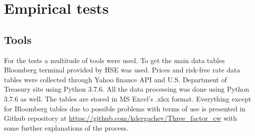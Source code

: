 \documentclass[a4paper,12pt]{article} %
\begin{document}
	\section{Empirical tests}
	\subsection{Tools}
	For the tests a multitude of tools were used. To get the main data tables Bloomberg terminal provided by HSE was used. Prices and risk-free rate data tables were collected through Yahoo finance API and U.S. Department of Treasury site using Python 3.7.6. All the data processing was done using Python 3.7.6 as well. The tables are stored in MS Excel's .xlsx format. Everything except for Bloomberg tables due to possible problems with terms of use is presented in Github repository at \url{https://github.com/kdergachev/Three_factor_cw} with some further explanations of the process.
\end{document}
